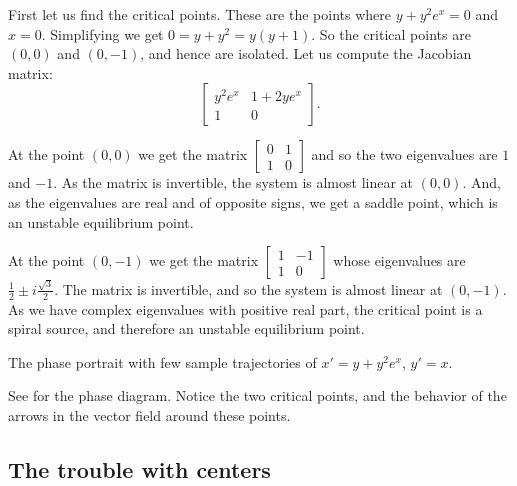 \documentclass{ximera}
\begin{document}
\begin{exampleSol}
    First let us find the critical points.  These are the points where $y+y^2e^x = 0$ and $x=0$.  Simplifying we get $0=y+y^2 = y(y+1)$.  So the critical points are $(0,0)$ and $(0,-1)$, and hence are isolated.  Let us compute the Jacobian matrix:
    \begin{equation*}
        \begin{bmatrix}
            y^2e^x & 1+2ye^x \\
            1 & 0
        \end{bmatrix}.
    \end{equation*}
    
    At the point $(0,0)$ we get the matrix 
    $\left[ \begin{smallmatrix} 0 & 1 \\ 1 & 0 \end{smallmatrix} \right]$ 
    and so the two eigenvalues are $1$ and $-1$.  As the matrix is invertible, the system is almost linear at $(0,0)$.  And, as the eigenvalues are real and of opposite signs, we get a saddle point, which is an unstable equilibrium point.
    
    At the point $(0,-1)$ we get the matrix 
    $\left[ \begin{smallmatrix} 1 & -1 \\ 1 & 0 \end{smallmatrix} \right]$ 
    whose eigenvalues are $\frac{1}{2} \pm i \frac{\sqrt{3}}{2}$. The matrix is invertible, and so the system is almost linear at $(0,-1)$. As we have complex eigenvalues with positive real part, the critical point is a spiral source, and therefore an unstable equilibrium point.
    
    \begin{myfig}
        \capstart
        \caption{The phase portrait with few sample trajectories of $x'=y+y^2e^x$, $y'=x$.  \label{fig:nlin-ex813}}
    \end{myfig}
    
    See  for the phase diagram.  Notice the two critical points, and the behavior of the arrows in the vector field around these points.
\end{exampleSol}

\subsection{The trouble with centers}
\end{document}
